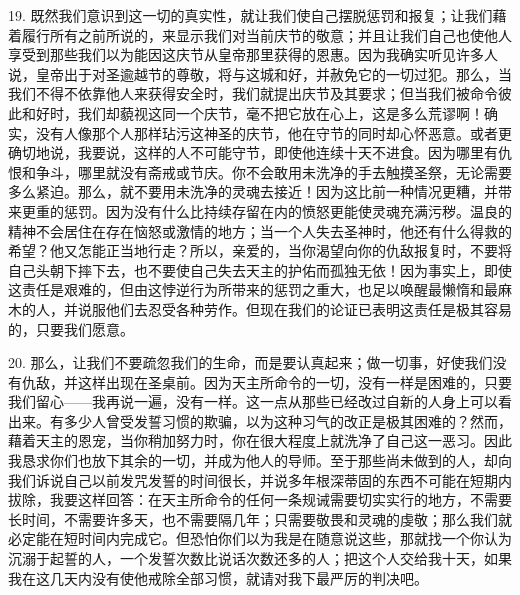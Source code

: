 19. 既然我们意识到这一切的真实性，就让我们使自己摆脱惩罚和报复；让我们藉着履行所有之前所说的，来显示我们对当前庆节的敬意；并且让我们自己也使他人享受到那些我们以为能因这庆节从皇帝那里获得的恩惠。因为我确实听见许多人说，皇帝出于对圣逾越节的尊敬，将与这城和好，并赦免它的一切过犯。那么，当我们不得不依靠他人来获得安全时，我们就提出庆节及其要求；但当我们被命令彼此和好时，我们却藐视这同一个庆节，毫不把它放在心上，这是多么荒谬啊！确实，没有人像那个人那样玷污这神圣的庆节，他在守节的同时却心怀恶意。或者更确切地说，我要说，这样的人不可能守节，即使他连续十天不进食。因为哪里有仇恨和争斗，哪里就没有斋戒或节庆。你不会敢用未洗净的手去触摸圣祭，无论需要多么紧迫。那么，就不要用未洗净的灵魂去接近！因为这比前一种情况更糟，并带来更重的惩罚。因为没有什么比持续存留在内的愤怒更能使灵魂充满污秽。温良的精神不会居住在存在恼怒或激情的地方；当一个人失去圣神时，他还有什么得救的希望？他又怎能正当地行走？所以，亲爱的，当你渴望向你的仇敌报复时，不要将自己头朝下摔下去，也不要使自己失去天主的护佑而孤独无依！因为事实上，即使这责任是艰难的，但由这悖逆行为所带来的惩罚之重大，也足以唤醒最懒惰和最麻木的人，并说服他们去忍受各种劳作。但现在我们的论证已表明这责任是极其容易的，只要我们愿意。\par

20. 那么，让我们不要疏忽我们的生命，而是要认真起来；做一切事，好使我们没有仇敌，并这样出现在圣桌前。因为天主所命令的一切，没有一样是困难的，只要我们留心——我再说一遍，没有一样。这一点从那些已经改过自新的人身上可以看出来。有多少人曾受发誓习惯的欺骗，以为这种习气的改正是极其困难的？然而，藉着天主的恩宠，当你稍加努力时，你在很大程度上就洗净了自己这一恶习。因此我恳求你们也放下其余的一切，并成为他人的导师。至于那些尚未做到的人，却向我们诉说自己以前发咒发誓的时间很长，并说多年根深蒂固的东西不可能在短期内拔除，我要这样回答：在天主所命令的任何一条规诫需要切实实行的地方，不需要长时间，不需要许多天，也不需要隔几年；只需要敬畏和灵魂的虔敬；那么我们就必定能在短时间内完成它。但恐怕你们以为我是在随意说这些，那就找一个你认为沉溺于起誓的人，一个发誓次数比说话次数还多的人；把这个人交给我十天，如果我在这几天内没有使他戒除全部习惯，就请对我下最严厉的判决吧。\par

